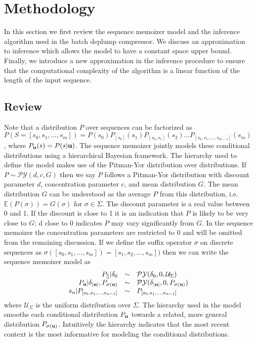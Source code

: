 \section{Methodology}
\label{section:methodology}
\newcommand{\PY}{\ensuremath{\mathcal{P}\mathcal{Y}}}

In this section we first review the sequence memoizer model and the inference algorithm used in the batch deplump compressor. We discuss an approximation to inference which allows the model to have a constant space upper bound.  Finally, we introduce a new approximation in the inference procedure to ensure that the computational complexity of the algorithm is a linear function of the length of the input sequence.

\subsection{Review}

Note that a distribution $P$ over sequences can be factorized as $P(S = [s_0, s_1, \ldots, s_m]) = P(s_0)P_{[s_0]}(s_1)P_{[s_0,s_1]}(s_2) \ldots P_{[s_0,s_1,\ldots,s_{m-1}]}(s_m)$, where $P_{\bf u}(s) = P(s | {\bf u})$.  The sequence memoizer \citep{Wood2009} jointly models these conditional distributions using a hierarchical Bayesian framework.  The hierarchy used to define the model makes use of the Pitman-Yor \citep{Pitman1997} distribution over distributions. If $P \sim \PY(d,c,G)$ then we say $P$ follows a Pitman-Yor distribution with discount parameter $d$, concentration parameter $c$, and mean distribution $G$.  The mean distribution $G$ can be understood as the average $P$ from this distribution, i.e. $\mathbb{E}(P(\sigma)) = G(\sigma)$ for $\sigma \in \Sigma$.  The discount parameter is a real value between 0 and 1.  If the discount is close to 1 it is an indication that $P$ is likely to be very close to $G$; d close to 0 indicates $P$ may vary significantly from $G$.  In the sequence memoizer the concentration parameters are restricted to 0 and will be omitted from the remaining discussion. If we define the suffix operator $\sigma$ on discrete sequences as $\sigma([s_0, s_1, \ldots, s_m]) = [s_1,s_2, \ldots, s_m])$ then we can write the sequence memoizer model as 
%
\[
\begin{array}{rcl}
	P_{[ ]} 	|	\delta_0 					& \sim & \PY(\delta_0,0,\mathcal{U}_{\Sigma})\\
	P_{\bf u} 	| 	\delta_{|{\bf u}|}, P_{\sigma({\bf u})} 	& \sim & \PY(\delta_{|{\bf u}|}, 0, P_{\sigma({\bf u})}) \\
	s_n 		|  	P_{[s_0, s_1, \ldots, s_{n-1}] }	& \sim & P_{[s_0, s_1, \ldots, s_{n-1}] }
\end{array}
\]
%
\noindent where $\mathcal{U}_{\Sigma}$ is the uniform distribution over $\Sigma$.  The hierarchy used in the model smooths each conditional distribution $P_{\bf u}$ towards a related, more general distribution $P_{\sigma({\bf u})}$.  Intuitively the hierarchy indicates that the most recent context is the most informative for modeling the conditional distributions.


